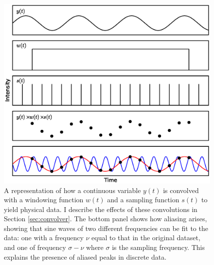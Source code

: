 \begin{figure}
    \includegraphics[width=\columnwidth, trim = 0mm 10mm 0mm 10mm]{images/convolve.eps}
    \captionsetup{singlelinecheck=off}
    \caption[A representation of how a continuous variable is convolved with a windowing function and a sampling function to yield physical data.]{A representation of how a continuous variable $y(t)$ is convolved with a windowing function $w(t)$ and a sampling function $s(t)$ to yield physical data.  I describe the effects of these convolutions in Section \ref{sec:convolver}.  The bottom panel shows how aliasing arises, showing that sine waves of two different frequencies can be fit to the data: one with a frequency $\nu$ equal to that in the original dataset, and one of frequency $\sigma-\nu$ where $\sigma$ is the sampling frequency.  This explains the presence of aliased peaks in discrete data.}
   \label{fig:convolve}
\end{figure}

